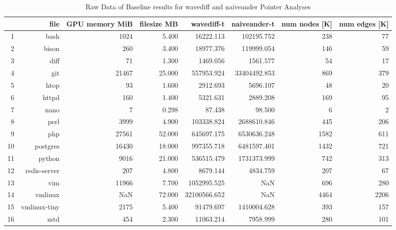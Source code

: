 \begin{table}[ht]
    \tiny
    \begin{tabular}{rrrrrrrr}
        \toprule
           & file         & GPU memory MiB & filesize MB & wavediff-t   & naiveander-t & num nodes [K] & num edges [K] \\
        \midrule
        1  & bash         & 1024           & 5.400       & 16222.113    & 102195.752   & 238           & 77            \\
        2  & bison        & 260            & 3.400       & 18977.376    & 119999.054   & 146           & 59            \\
        3  & diff         & 71             & 1.300       & 1469.056     & 1561.577     & 54            & 17            \\
        4  & git          & 21467          & 25.000      & 557953.924   & 33404492.853 & 869           & 379           \\
        5  & htop         & 93             & 1.600       & 2912.693     & 5696.107     & 48            & 20            \\
        6  & httpd        & 160            & 1.400       & 5321.631     & 2889.208     & 169           & 95            \\
        7  & nano         & 7              & 0.298       & 87.438       & 98.500       & 6             & 2             \\
        8  & perl         & 3999           & 4.900       & 103338.824   & 2688610.846  & 445           & 206           \\
        9  & php          & 27561          & 52.000      & 645697.175   & 6530636.248  & 1582          & 611           \\
        10 & postgres     & 16430          & 18.000      & 997355.718   & 6481597.401  & 1432          & 721           \\
        11 & python       & 9016           & 21.000      & 536515.479   & 1731373.999  & 742           & 313           \\
        12 & redis-server & 207            & 4.800       & 8679.144     & 4834.759     & 207           & 67            \\
        13 & vim          & 11966          & 7.700       & 1052995.525  & NaN          & 696           & 280           \\
        14 & vmlinux      & NaN            & 72.000      & 32100566.652 & NaN          & 4464          & 2206          \\
        15 & vmlinux-tiny & 2175           & 5.400       & 91479.697    & 1410004.628  & 393           & 157           \\
        16 & zstd         & 454            & 2.300       & 11063.214    & 7958.999     & 280           & 101           \\
        \bottomrule
    \end{tabular}

    \caption{Raw Data of Baseline results for wavediff and naiveander Pointer Analyses}
\end{table}

